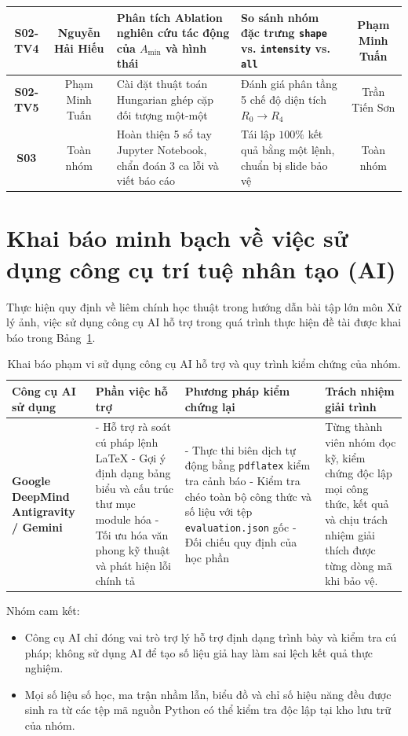 \begin{table}[H]
{\begin{tabular}{|c|c|p{5.5cm}|p{5.5cm}|c|}
\textbf{S02-TV4} & Nguyễn Hải Hiếu & Phân tích Ablation nghiên cứu tác động của $A_{\min}$ và hình thái & So sánh nhóm đặc trưng \texttt{shape} vs. \texttt{intensity} vs. \texttt{all} & Phạm Minh Tuấn \\ \hline
\textbf{S02-TV5} & Phạm Minh Tuấn & Cài đặt thuật toán Hungarian ghép cặp đối tượng một-một & Đánh giá phân tầng 5 chế độ diện tích $R_0 \to R_4$ & Trần Tiến Sơn \\ \hline
\textbf{S03} & Toàn nhóm & Hoàn thiện 5 sổ tay Jupyter Notebook, chẩn đoán 3 ca lỗi và viết báo cáo & Tái lập $100\%$ kết quả bằng một lệnh, chuẩn bị slide bảo vệ & Toàn nhóm \\ \hline
\end{tabular}%
}
\end{table}

\section{Khai báo minh bạch về việc sử dụng công cụ trí tuệ nhân tạo (AI)}

Thực hiện quy định về liêm chính học thuật trong hướng dẫn bài tập lớn môn Xử lý ảnh, việc sử dụng công cụ AI hỗ trợ trong quá trình thực hiện đề tài được khai báo trong Bảng~\ref{tab:khai_bao_ai}.

\begin{table}[H]
\centering
\caption{Khai báo phạm vi sử dụng công cụ AI hỗ trợ và quy trình kiểm chứng của nhóm.}
\label{tab:khai_bao_ai}
\begin{tabular}{|p{3.2cm}|p{4.5cm}|p{4.5cm}|p{3.5cm}|}
\hline
\textbf{Công cụ AI sử dụng} & \textbf{Phần việc hỗ trợ} & \textbf{Phương pháp kiểm chứng lại} & \textbf{Trách nhiệm giải trình} \\ \hline
\textbf{Google DeepMind Antigravity / Gemini} & 
- Hỗ trợ rà soát cú pháp lệnh LaTeX \newline 
- Gợi ý định dạng bảng biểu và cấu trúc thư mục module hóa \newline 
- Tối ưu hóa văn phong kỹ thuật và phát hiện lỗi chính tả & 
- Thực thi biên dịch tự động bằng \texttt{pdflatex} kiểm tra cảnh báo \newline 
- Kiểm tra chéo toàn bộ công thức và số liệu với tệp \texttt{evaluation.json} gốc \newline 
- Đối chiếu quy định của học phần & 
Từng thành viên nhóm đọc kỹ, kiểm chứng độc lập mọi công thức, kết quả và chịu trách nhiệm giải thích được từng dòng mã khi bảo vệ. \\ \hline
\end{tabular}
\end{table}

Nhóm cam kết:
\begin{itemize}
    \item Công cụ AI chỉ đóng vai trò trợ lý hỗ trợ định dạng trình bày và kiểm tra cú pháp; không sử dụng AI để tạo số liệu giả hay làm sai lệch kết quả thực nghiệm.
    \item Mọi số liệu số học, ma trận nhầm lẫn, biểu đồ và chỉ số hiệu năng đều được sinh ra từ các tệp mã nguồn Python có thể kiểm tra độc lập tại kho lưu trữ của nhóm.
\end{itemize}
